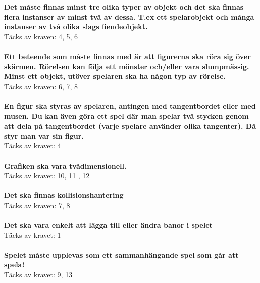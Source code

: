 \documentclass{TDP005mall}
\begin{document}
\textbf{Det måste finnas minst tre olika typer av objekt och det ska finnas flera instanser av minst två av dessa. T.ex ett spelarobjekt och många instanser av två olika slags fiendeobjekt.}
\\
Täcks av kraven: 4, 5, 6
\\\\
\textbf{Ett beteende som måste finnas med är att figurerna ska röra sig över skärmen. Rörelsen kan följa ett mönster och/eller vara slumpmässig. Minst ett objekt, utöver spelaren ska ha någon typ av rörelse.}
\\
Täcks av kraven: 6, 7, 8 
\\\\
\textbf{En figur ska styras av spelaren, antingen med tangentbordet eller med musen. Du kan även göra ett spel där man spelar två stycken genom att dela på tangentbordet (varje spelare använder olika tangenter). Då styr man var sin figur.}
\\
Täcks av kravet: 4  
\\\\
\textbf{Grafiken ska vara tvådimensionell.}
\\
Täcks av kravet: 10, 11 , 12
\\\\
\textbf{Det ska finnas kollisionshantering}
\\
Täcks av kraven: 7, 8 
\\\\
\textbf{Det ska vara enkelt att lägga till eller ändra banor i spelet}
\\
Täcks av kravet: 1
\\\\
\textbf{Spelet måste upplevas som ett sammanhängande spel som går att spela!}
\\
Täcks av kravet: 9, 13
\end{document}
